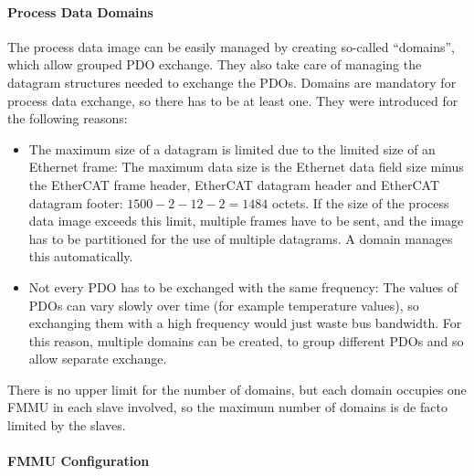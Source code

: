 \documentclass[a4paper,12pt,BCOR6mm,bibtotoc,idxtotoc]{scrbook}
\begin{document}
\paragraph{Process Data Domains}

The process data image can be easily managed by creating so-called
``domains'', which allow grouped PDO exchange. They also take care of managing
the datagram structures needed to exchange the PDOs. Domains are mandatory for
process data exchange, so there has to be at least one. They were introduced
for the following reasons:

\begin{itemize}

\item The maximum size of a datagram is limited due to the limited size of an
Ethernet frame: The maximum data size is the Ethernet data field size minus
the EtherCAT frame header, EtherCAT datagram header and EtherCAT datagram
footer: $1500 - 2 - 12 - 2 = 1484$ octets. If the size of the process data
image exceeds this limit, multiple frames have to be sent, and the image has
to be partitioned for the use of multiple datagrams. A domain manages this
automatically.

\item Not every PDO has to be exchanged with the same frequency: The values of
PDOs can vary slowly over time (for example temperature values), so exchanging
them with a high frequency would just waste bus bandwidth. For this reason,
multiple domains can be created, to group different PDOs and so allow separate
exchange.

\end{itemize}

There is no upper limit for the number of domains, but each domain occupies
one FMMU in each slave involved, so the maximum number of domains is de facto
limited by the slaves.

\paragraph{FMMU Configuration}
\end{document}
